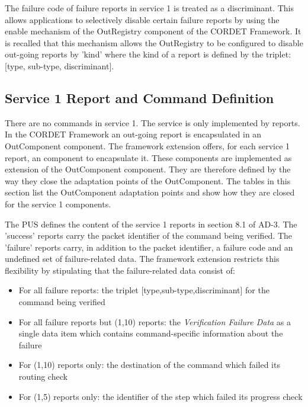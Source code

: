 \documentclass{pnp_article}
\begin{document}
The failure code of failure reports in service 1 is treated as a discriminant. This allows applications to selectively disable certain failure reports by using the enable mechanism of the OutRegistry component of the CORDET Framework. It is recalled that this mechanism allows the OutRegistry to be configured to disable out-going reports by 'kind' where the kind of a report is defined by the triplet: [type, sub-type, discriminant]. 


\subsection{Service 1 Report and Command Definition}\label{sec:serv1RepDef}
There are no commands in service 1. The service is only implemented by reports. In the CORDET Framework an out-going report is encapsulated in an OutComponent component. The framework extension offers, for each service 1 report, an component to encapsulate it. These components are implemented as extension of the OutComponent component. They are therefore defined by the way they close the adaptation points of the OutComponent. The tables in this section list the OutComponent adaptation points and show how they are closed for the service 1 components.

The PUS defines the content of the service 1 reports in section 8.1 of AD-3. The 'success' reports carry the packet identifier of the command being verified. The 'failure' reports carry, in addition to the packet identifier, a failure code and an undefined set of failure-related data. The framework extension restricts this flexibility by stipulating that the failure-related data consist of: 

\begin{itemize}
\item For all failure reports: the triplet [type,sub-type,discriminant] for the command being verified
\item For all failure reports but (1,10) reports: the \textit{Verification Failure Data} as a single data item which contains command-specific information about the failure 
\item For (1,10) reports only: the destination of the command which failed its routing check
\item For (1,5) reports only: the identifier of the step which failed its progress check
\end{itemize}
\end{document}
